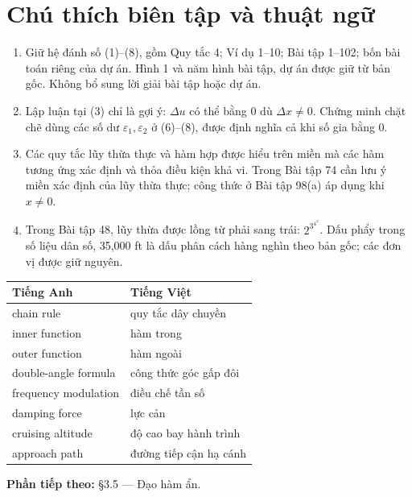\documentclass[12pt,a4paper]{article}
\begin{document}
\section*{Chú thích biên tập và thuật ngữ}
\begin{enumerate}[leftmargin=*]
\item Giữ hệ đánh số (1)–(8), gồm Quy tắc 4; Ví dụ 1–10; Bài tập 1–102; bốn bài toán riêng của dự án. Hình 1 và năm hình bài tập, dự án được giữ từ bản gốc. Không bổ sung lời giải bài tập hoặc dự án.
\item Lập luận tại (3) chỉ là gợi ý: $\Delta u$ có thể bằng 0 dù $\Delta x\ne0$. Chứng minh chặt chẽ dùng các số dư $\varepsilon_1,\varepsilon_2$ ở (6)–(8), được định nghĩa cả khi số gia bằng 0.
\item Các quy tắc lũy thừa thực và hàm hợp được hiểu trên miền mà các hàm tương ứng xác định và thỏa điều kiện khả vi. Trong Bài tập 74 cần lưu ý miền xác định của lũy thừa thực; công thức ở Bài tập 98(a) áp dụng khi $x\ne0$.
\item Trong Bài tập 48, lũy thừa được lồng từ phải sang trái: $2^{3^{4^x}}$. Dấu phẩy trong số liệu dân số, 35,000 ft là dấu phân cách hàng nghìn theo bản gốc; các đơn vị được giữ nguyên.
\end{enumerate}
\begin{center}\begin{tabular}{ll}\toprule
Tiếng Anh&Tiếng Việt\\\midrule
chain rule&quy tắc dây chuyền\\
inner function&hàm trong\\
outer function&hàm ngoài\\
double-angle formula&công thức góc gấp đôi\\
frequency modulation&điều chế tần số\\
damping force&lực cản\\
cruising altitude&độ cao bay hành trình\\
approach path&đường tiếp cận hạ cánh\\\bottomrule
\end{tabular}\end{center}
\noindent\textbf{Phần tiếp theo:} §3.5 — Đạo hàm ẩn.
\end{document}
